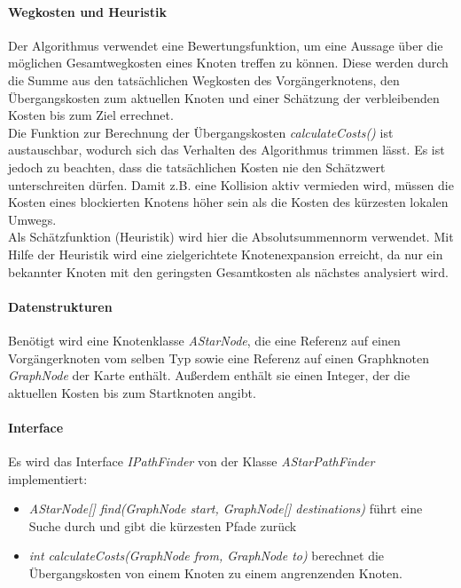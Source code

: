\documentclass[10pt,a4paper]{article}
\begin{document}
		\paragraph{Wegkosten und Heuristik}
			Der Algorithmus verwendet eine Bewertungsfunktion, um eine Aussage über die möglichen Gesamtwegkosten eines 
			Knoten treffen zu können. Diese werden durch die Summe aus den tatsächlichen Wegkosten des Vorgängerknotens, 
			den Übergangskosten zum aktuellen Knoten und einer Schätzung der verbleibenden Kosten bis zum Ziel 
			errechnet. \\

			Die Funktion zur Berechnung der Übergangskosten \textit{calculateCosts()} ist austauschbar, wodurch sich das
			Verhalten des Algorithmus trimmen lässt. Es ist jedoch zu beachten, dass die tatsächlichen Kosten nie den
			Schätzwert unterschreiten dürfen. Damit z.B. eine Kollision aktiv vermieden wird, müssen die Kosten eines
			blockierten Knotens höher sein als die Kosten des kürzesten lokalen Umwegs. \\

			Als Schätzfunktion (Heuristik) wird hier die Absolutsummennorm verwendet. Mit Hilfe der Heuristik wird eine 
			zielgerichtete Knotenexpansion erreicht, da nur ein bekannter Knoten mit den 
			geringsten Gesamtkosten als nächstes analysiert wird.
		\paragraph{Datenstrukturen}
			Benötigt wird eine Knotenklasse \textit{AStarNode}, die eine Referenz auf einen Vorgängerknoten vom selben
			Typ sowie eine Referenz auf	einen Graphknoten \textit{GraphNode} der Karte enthält. Außerdem enthält sie
			einen Integer, der die aktuellen Kosten bis zum Startknoten angibt.
		\paragraph{Interface}
			Es wird das Interface \textit{IPathFinder} von der Klasse \textit{AStarPathFinder} implementiert:
			\begin{itemize}
				\item \textit{AStarNode[] find(GraphNode start, GraphNode[] destinations)} führt eine Suche durch und
				gibt die kürzesten Pfade zurück
				\item \textit{int calculateCosts(GraphNode from, GraphNode to)} berechnet die Übergangskosten von einem
				Knoten zu einem angrenzenden Knoten.
			\end{itemize}
\end{document}
